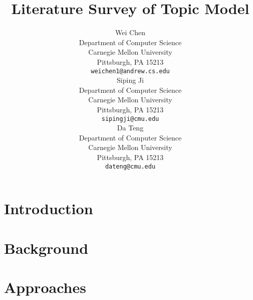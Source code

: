 \documentclass{article} %
\title{Literature Survey of Topic Model}
\author{
Wei Chen \\
Department of Computer Science\\
Carnegie Mellon University\\
Pittsburgh, PA 15213 \\
\texttt{weichen1@andrew.cs.edu} \\
\And
Siping Ji\\
Department of Computer Science\\
Carnegie Mellon University\\
Pittsburgh, PA 15213 \\
\texttt{sipingji@cmu.edu} \\
\AND
Da Teng \\
Department of Computer Science\\
Carnegie Mellon University\\
Pittsburgh, PA 15213 \\
\texttt{dateng@cmu.edu} \\
}
\begin{document}
\maketitle

\tableofcontents

\newpage
\section{Introduction}
    \label{sec:intro}
    
    
\section{Background}
    \label{sec:background}
    
    
\section{Approaches}
    \label{sec:approach}
    

%
%
%



\end{document}
